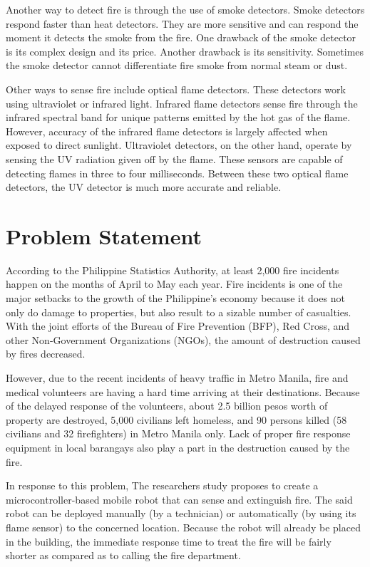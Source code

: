 	Another way to detect fire is through the use of smoke detectors. Smoke detectors respond faster than heat detectors. They are more sensitive and can respond the moment it detects the smoke from the fire. One drawback of the smoke detector is its complex design and its price. Another drawback is its sensitivity. Sometimes the smoke detector cannot differentiate fire smoke from normal steam or dust.

	Other ways to sense fire include optical flame detectors. These detectors work using ultraviolet or infrared light. Infrared flame detectors sense fire through the infrared spectral band for unique patterns emitted by the hot gas of the flame. However, accuracy of the infrared flame detectors is largely affected when exposed to direct sunlight. Ultraviolet detectors, on the other hand, operate by sensing the UV radiation given off by the flame. These sensors are capable of detecting flames in three to four milliseconds. Between these two optical flame detectors, the UV detector is much more accurate and reliable.

\section{Problem Statement}

	
		According to the Philippine Statistics Authority, at least 2,000 fire incidents happen on the months of April to May each year. Fire incidents is one of the major setbacks to the growth of the Philippine’s economy because it does not only do damage to properties, but also result to a sizable number of casualties. With the joint efforts of the Bureau of Fire Prevention (BFP), Red Cross, and other Non-Government Organizations (NGOs), the amount of destruction caused by fires decreased.
    
		However, due to the recent incidents of heavy traffic in Metro Manila, fire and medical volunteers are having a hard time arriving at their destinations. Because of the delayed response of the volunteers, about 2.5 billion pesos worth of property are destroyed, 5,000 civilians left homeless, and 90 persons killed (58 civilians and 32 firefighters) in Metro Manila only. Lack of proper fire response equipment in local barangays also play a part in the destruction caused by the fire.
    
		In response to this problem, The researchers study proposes to create a microcontroller-based mobile robot that can sense and extinguish fire. The said robot can be deployed manually (by a technician) or automatically (by using its flame sensor) to the concerned location. Because the robot will already be placed in the building, the immediate response time to treat the fire will be fairly shorter as compared as to calling the fire department.

